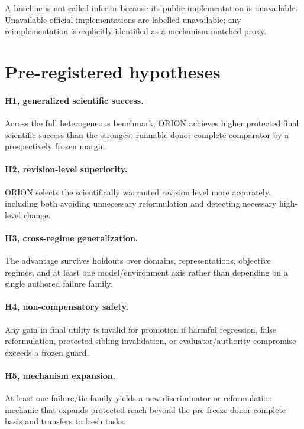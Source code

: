 \documentclass[11pt]{article}
\begin{document}
A baseline is not called inferior because its public implementation is unavailable. Unavailable official implementations are labelled unavailable; any reimplementation is explicitly identified as a mechanism-matched proxy.

\section{Pre-registered hypotheses}
\paragraph{H1, generalized scientific success.}
Across the full heterogeneous benchmark, ORION achieves higher protected final scientific success than the strongest runnable donor-complete comparator by a prospectively frozen margin.

\paragraph{H2, revision-level superiority.}
ORION selects the scientifically warranted revision level more accurately, including both avoiding unnecessary reformulation and detecting necessary high-level change.

\paragraph{H3, cross-regime generalization.}
The advantage survives holdouts over domains, representations, objective regimes, and at least one model/environment axis rather than depending on a single authored failure family.

\paragraph{H4, non-compensatory safety.}
Any gain in final utility is invalid for promotion if harmful regression, false reformulation, protected-sibling invalidation, or evaluator/authority compromise exceeds a frozen guard.

\paragraph{H5, mechanism expansion.}
At least one failure/tie family yields a new discriminator or reformulation mechanic that expands protected reach beyond the pre-freeze donor-complete basis and transfers to fresh tasks.
\end{document}
